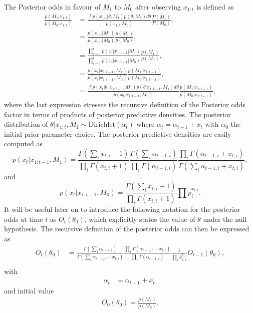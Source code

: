 \documentclass[11pt]{article}
\begin{document}
The Posterior odds in favour of $M_1$ to $M_0$ after observing $x_{1:t}$ is defined as
\begin{align}
  \label{eq:general_posterior_odds}
  \frac{p(M_1|x_{1:t})}{p(M_0|x_{1:t})}  &= \frac{\int p(x_{1:t}|\theta,M_1)p(\theta,M_1)d\theta}{p(x_{1:t}|M_0)}\frac{P(M_1)}{P(M_0)},\\
                      &=\frac{p(x_{1:t}|M_1)}{p(x_{1:t}|M_0)}\frac{p(M_1)}{p(M_0)},\\
                      &=\frac{\prod_{i=1}^{t}p(x_i|x_{1:i-1}|M_1)}{\prod_{i=1}^{t}p(x_i|x_{1:i-1}|M_0)}\frac{p(M_1)}{p(M_0)},\\
                      &=\frac{p(x_t|x_{1:t-1},M_1)}{p(x_t|x_{1:t-1},M_0)} \frac{p(M_1|x_{1:t-1})}{p(M_0|x_{1:t-1})},\\
    &=\frac{\int p(x_t|\theta,x_{1:t-1},M_1)p(\theta|x_{1:t-1},M_1)d\theta}{p(x_t|x_{1:t-1},M_0)}  \frac{p(M_1|x_{1:t-1})}{p(M_0|x_{1:t-1})} ,
\end{align}
where the last expression stresses the recursive definition of the Posterior odds factor in terms of products of posterior predictive densities. The posterior distribution of $\theta| x_{1:t}, M_1 \sim \text{Dirichlet}(\alpha_t)$ where $\alpha_t = \alpha_{t-1}+x_t$ with $\alpha_0$ the initial prior parameter choice. The posterior predictive densities are easily computed as
\begin{equation}
  \label{eq:posterior_predictive_m1}
   p(x_t|x_{1:t-1},M_1) = \frac{ \Gamma(\sum_i x_{t,i}+ 1)}{\prod_i \Gamma(x_{t,i} + 1)} \frac{\Gamma(\sum_i \alpha_{t-1,i})}{\prod_i \Gamma(\alpha_{t-1,i})} \frac{\prod_i \Gamma(\alpha_{t-1,i} + x_{t,i})}{\Gamma(\sum_i \alpha_{t-1,i} + x_{t,i})},
\end{equation}
and
\begin{equation}
  \label{eq:posterior_predictive_m2}
   p(x_t|x_{1:t-1},M_0) = \frac{ \Gamma(\sum_i x_{t,i} + 1)}{\prod_i \Gamma(x_{t,i} + 1)} \prod p_i^{x_{t,i}}.
 \end{equation}
 It will be useful later on to introduce the following notation for the posterior odds at time $t$ as $O_t(\theta_0)$, which explicitly states the value of $\theta$ under the null hypothesis. The recursive definition of the posterior odds can then be expressed as
\begin{align}
  O_{t}(\theta_0) &= \frac{\Gamma(\sum_i \alpha_{t-1,i})}{\Gamma(\sum_i \alpha_{t-1,i} +  x_{t,i})} \frac{\prod_i \Gamma(\alpha_{t-1,i} + x_{t,i})}{\prod_i \Gamma(\alpha_{t-1,i})} \frac{1}{\prod_i \theta_{0,i}^{x_{t,i}}}  O_{t-1}(\theta_0),\\
\end{align}
with
\begin{align}
  \label{eq:alpha_update}
  \alpha_{t}&= \alpha_{t-1}+x_t.
\end{align}
and initial value
\begin{align}
  \label{eq:bayes_factor_seed}
O_0(\theta_0) = \frac{p(M_1)}{p(M_0)}.
\end{align}
\end{document}
